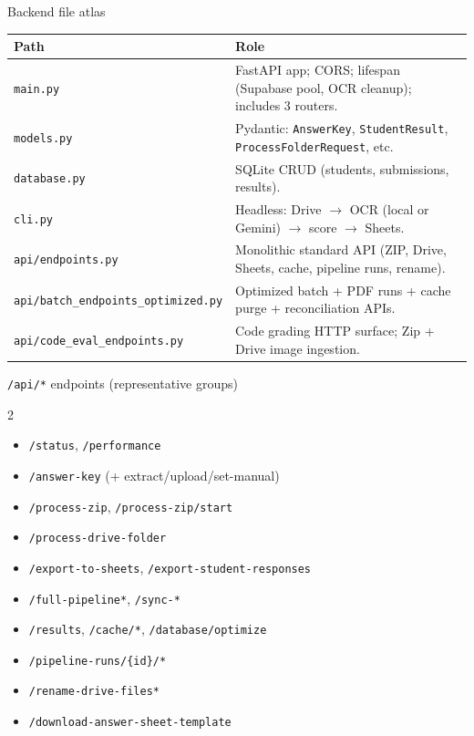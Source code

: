 \documentclass[aspectratio=169]{beamer}
\begin{document}
\begin{frame}{Backend file atlas}
  \tiny
  \begin{tabular}{@{}p{4.8cm}p{9.0cm}@{}}
    \toprule
    Path & Role \\
    \midrule
    \texttt{main.py} & FastAPI app; CORS; lifespan (Supabase pool, OCR cleanup); includes 3 routers. \\
    \texttt{models.py} & Pydantic: \texttt{AnswerKey}, \texttt{StudentResult}, \texttt{ProcessFolderRequest}, etc. \\
    \texttt{database.py} & SQLite CRUD (students, submissions, results). \\
    \texttt{cli.py} & Headless: Drive $\rightarrow$ OCR (local or Gemini) $\rightarrow$ score $\rightarrow$ Sheets. \\
    \texttt{api/endpoints.py} & Monolithic standard API (ZIP, Drive, Sheets, cache, pipeline runs, rename). \\
    \texttt{api/batch\_endpoints\_optimized.py} & Optimized batch + PDF runs + cache purge + reconciliation APIs. \\
    \texttt{api/code\_eval\_endpoints.py} & Code grading HTTP surface; Zip + Drive image ingestion. \\
    \bottomrule
  \end{tabular}
\end{frame}

\begin{frame}{\texttt{/api/*} endpoints (representative groups)}
  \tiny
  \begin{multicols}{2}
    \begin{itemize}\setlength\itemsep{0.05em}
      \item \texttt{/status}, \texttt{/performance}
      \item \texttt{/answer-key} (+ extract/upload/set-manual)
      \item \texttt{/process-zip}, \texttt{/process-zip/start}
      \item \texttt{/process-drive-folder}
      \item \texttt{/export-to-sheets}, \texttt{/export-student-responses}
      \item \texttt{/full-pipeline*}, \texttt{/sync-*}
      \item \texttt{/results}, \texttt{/cache/*}, \texttt{/database/optimize}
      \item \texttt{/pipeline-runs/\{id\}/*}
      \item \texttt{/rename-drive-files*}
      \item \texttt{/download-answer-sheet-template}
    \end{itemize}
  \end{multicols}
\end{frame}
\end{document}
